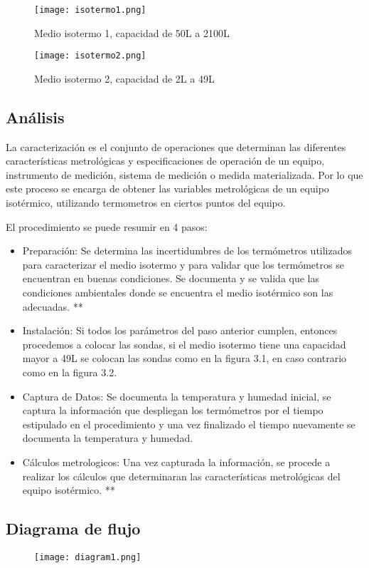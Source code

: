 		\begin{figure}[H]
			\centering
			\texttt{[image: isotermo1.png]}
			\caption{Medio isotermo 1, capacidad de 50L a 2100L}
		\end{figure}
		
		\begin{figure}[H]
			\centering
			\texttt{[image: isotermo2.png]}
			\caption{Medio isotermo 2, capacidad de 2L a 49L}
		\end{figure}

	
\clearpage
\thispagestyle{plain}	

	\subsection{Análisis}
		\par 
		La caracterización es el conjunto de operaciones que determinan las diferentes
		características metrológicas y especificaciones de operación de un
		equipo, instrumento de medición, sistema de medición o medida
		materializada. Por lo que este proceso se encarga de obtener las variables metrológicas de un equipo isotérmico, utilizando termometros en ciertos puntos del equipo. 
		
		\par \noindent
		El procedimiento se puede resumir en 4 pasos:
		
		\begin{itemize}
			\item Preparación: Se determina las incertidumbres de los termómetros utilizados para caracterizar el medio isotermo y para validar que los termómetros se encuentran en buenas condiciones. Se documenta y se valida que las condiciones ambientales donde se encuentra el medio isotérmico son las adecuadas. **
			
			\item Instalación: Si todos los parámetros del paso anterior cumplen, entonces procedemos a colocar las sondas, si el medio isotermo tiene una capacidad mayor a 49L se colocan las sondas como en la figura 3.1, en caso contrario como en la figura 3.2.
			
			\item Captura de Datos: Se documenta la temperatura y humedad inicial, se captura la información que despliegan los termómetros por el tiempo estipulado en el procedimiento y una vez finalizado el tiempo nuevamente se documenta la temperatura y humedad.
			
			\item Cálculos metrologicos: Una vez capturada la información, se procede a realizar los cálculos que determinaran las características metrológicas del equipo isotérmico. ** 
		\end{itemize}

		
		
\clearpage
\thispagestyle{plain}

	\subsection{Diagrama de flujo}
	\begin{figure}[H]
		\centering
		\texttt{[image: diagram1.png]}
	\end{figure}

\clearpage
\thispagestyle{plain}